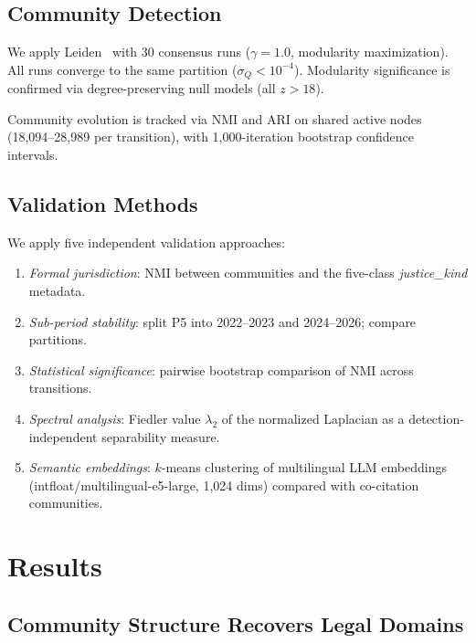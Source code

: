\documentclass[11pt]{article}
\begin{document}
\subsection{Community Detection}

We apply Leiden~\citep{traag2019louvain} with 30 consensus runs ($\gamma = 1.0$, modularity maximization).
All runs converge to the same partition ($\sigma_Q < 10^{-4}$).
Modularity significance is confirmed via degree-preserving null models (all $z > 18$).

Community evolution is tracked via NMI and ARI on shared active nodes (18{,}094--28{,}989 per transition), with 1{,}000-iteration bootstrap confidence intervals.

\subsection{Validation Methods}

We apply five independent validation approaches:
\begin{enumerate}[nosep]
  \item \emph{Formal jurisdiction}: NMI between communities and the five-class \emph{justice\_kind} metadata.
  \item \emph{Sub-period stability}: split P5 into 2022--2023 and 2024--2026; compare partitions.
  \item \emph{Statistical significance}: pairwise bootstrap comparison of NMI across transitions.
  \item \emph{Spectral analysis}: Fiedler value $\lambda_2$ of the normalized Laplacian as a detection-independent separability measure.
  \item \emph{Semantic embeddings}: $k$-means clustering of multilingual LLM embeddings (intfloat/multilingual-e5-large, 1{,}024 dims) compared with co-citation communities.
\end{enumerate}

\section{Results}
\label{sec:results}

\subsection{Community Structure Recovers Legal Domains}
\end{document}
